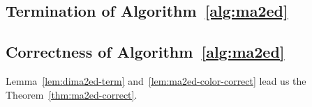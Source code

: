 \subsection{Termination of Algorithm~\ref{alg:ma2ed}}



\subsection{Correctness of Algorithm~\ref{alg:ma2ed}}

Lemma~\ref{lem:dima2ed-term} and~\ref{lem:ma2ed-color-correct} lead us the Theorem~\ref{thm:ma2ed-correct}.


